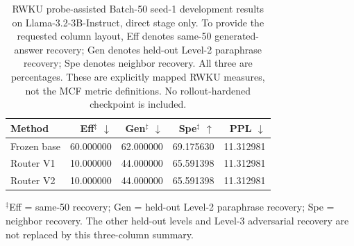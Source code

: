 \documentclass{article}
\begin{document}
\begin{table}[t]
\centering
\small
\caption{RWKU probe-assisted Batch-50 seed-1 development results on
Llama-3.2-3B-Instruct, direct stage only. To provide the requested column layout,
Eff denotes same-50 generated-answer recovery; Gen denotes held-out Level-2
paraphrase recovery; Spe denotes neighbor recovery. All three are percentages.
These are explicitly mapped RWKU measures, not the MCF metric definitions.
No rollout-hardened checkpoint is included.}
\label{tab:rwku-seed1-eff-gen-spe-ppl}
\begin{tabular}{@{}lrrrr@{}}
\toprule
Method & Eff$^{\ddagger}$ $\downarrow$ & Gen$^{\ddagger}$ $\downarrow$ & Spe$^{\ddagger}$ $\uparrow$ & PPL $\downarrow$ \\
\midrule
Frozen base & 60.000000 & 62.000000 & 69.175630 & 11.312981 \\
Router V1   & 10.000000 & 44.000000 & 65.591398 & 11.312981 \\
Router V2   & 10.000000 & 44.000000 & 65.591398 & 11.312981 \\
\bottomrule
\end{tabular}
\par\smallskip
\begin{minipage}{0.98\linewidth}
\footnotesize $^{\ddagger}$Eff = same-50 recovery; Gen = held-out Level-2
paraphrase recovery; Spe = neighbor recovery. The other held-out levels and
Level-3 adversarial recovery are not replaced by this three-column summary.
\end{minipage}
\end{table}
\end{document}
